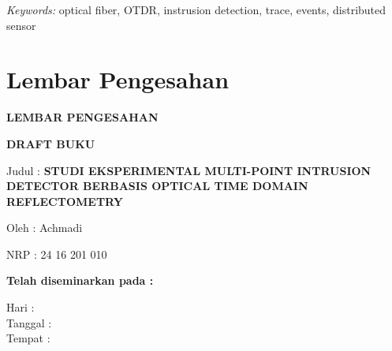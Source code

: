 \documentclass[12pt]{article}
\providecommand{\keyworden}[1]{\textit{Keywords: } #1}
\begin{document}
	\keyworden{optical fiber, OTDR, instrusion detection, trace, events, distributed sensor}
	

\newpage
\thispagestyle{plain}
\mbox{}


\newpage

	\section{Lembar Pengesahan}
	
	\begin{center}
		\textbf{LEMBAR PENGESAHAN}
	\end{center}
	
	\begin{center}
		\textbf{DRAFT BUKU}
	\end{center}

	\vspace{10pt}

	\begin{flushleft}
		Judul	: \textbf{STUDI EKSPERIMENTAL MULTI-POINT INTRUSION DETECTOR BERBASIS OPTICAL TIME DOMAIN REFLECTOMETRY}
	\end{flushleft}

	\begin{flushleft}
		Oleh : Achmadi
	\end{flushleft}

	\begin{flushleft}
		NRP : 24 16 201 010
	\end{flushleft}

	\vspace{20pt}
	
	\begin{center}
		\textbf{Telah diseminarkan pada :}
	\end{center}

	\vspace{10pt}

	\begin{flushleft}
		Hari \hspace{17pt}: \\
		Tanggal :\\
		Tempat \hspace{3pt}:  \\
	\end{flushleft}
\end{document}
